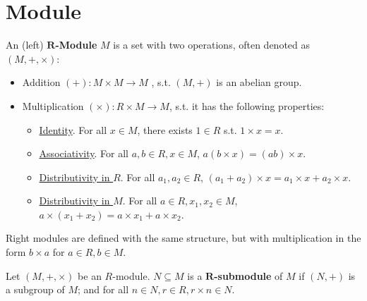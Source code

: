 \def\Ann{\mathrm{Ann}}
\def\Supp{\mathrm{Supp}}

\section{Module}

\begin{definition}[$R$-Module]
    An (left) \textbf{$\bm{R}$-Module} $M$ is a set with two operations, often denoted as $(M, +, \times)$:
    \begin{itemize}
        \item Addition $(+): M\times M \to M$ , s.t. $(M, +)$ is an abelian group.
        \item Multiplication $(\times): R\times M \to M$, s.t. it has the following properties:
            \begin{itemize}
                \item \underline{Identity}. For all $x\in M$, there exists $1\in R$ s.t. $1\times x = x$.
                \item \underline{Associativity}. For all $a, b\in R, x\in M$, $a(b\times x) = (ab)\times x$.
                \item \underline{Distributivity in $R$}. For all $a_1, a_2\in R$, $(a_1 + a_2)\times x = a_1\times x + a_2\times x$.
                \item \underline{Distributivity in $M$}. For all $a\in R, x_1, x_2\in M$, $a\times (x_1 + x_2) = a\times x_1 + a\times x_2$.
            \end{itemize}
    \end{itemize}
    Right modules are defined with the same structure, but with multiplication in the form $b\times a$ for $a\in R, b\in M$.
\end{definition}

\begin{definition}[Submodule]
    Let $(M, +, \times)$ be an $R$-module. $N \subseteq M$ is a \textbf{$\bm{R}$-submodule} of $M$ if $(N, +)$ is a subgroup of $M$; and for all $n\in N, r\in R, r\times n\in N$.
\end{definition}

